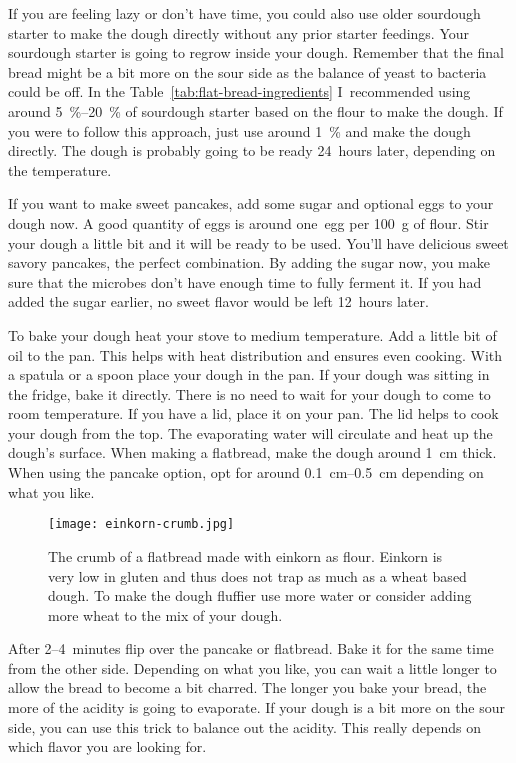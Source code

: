If you are feeling lazy or don't have time, you could also use older sourdough starter
to make the dough directly without any prior starter feedings. Your sourdough starter
is going to regrow inside your dough. Remember that the
final bread might be a bit more on the sour side as the balance of yeast to
bacteria could be off. In the Table~\ref{tab:flat-bread-ingredients}
I~recommended using around \qtyrange{5}{20}{\percent}
of sourdough starter based on the flour to make the dough. If you were to follow
this approach, just use around \qty{1}{\percent} and make the dough directly.
The dough is probably going to be ready 24~hours later, depending on the temperature.

If you want to make sweet pancakes, add some sugar and optional eggs to your dough
now. A good quantity of eggs is around one~egg per \qty{100}{\gram} of flour.
Stir your dough a little bit and it will be ready to be used. You'll
have delicious sweet savory pancakes, the perfect combination. By
adding the sugar now, you make sure that the microbes don't have
enough time to fully ferment it. If you had added the sugar
earlier, no sweet flavor would be left  12~hours later.

To bake your dough heat your stove to medium temperature. Add a little bit of
oil to the pan. This helps with heat distribution and ensures even cooking.
With a spatula or a spoon place your dough in the pan. If your dough
was sitting in the fridge, bake it directly. There is no need to wait for your
dough to come to room temperature. If you have a lid,
place it on your pan. The lid helps to cook your dough from the top.
The evaporating water will circulate and heat up the dough's surface. When
making a flatbread, make the dough around \qty{1}{\cm} thick. When using the
pancake option, opt for around \qtyrange{0.1}{0.5}{\cm} depending on what you
like.

\begin{figure}[htb]
\begin{center}
  \texttt{[image: einkorn-crumb.jpg]}
  \caption[Einkorn crum]{The crumb of a flatbread made with einkorn as flour.
      Einkorn is very low in gluten and thus does not trap as much  as
      a wheat based dough. To make the dough fluffier use more water or
      consider adding more wheat to the mix of your dough.}
\end{center}
\end{figure}

After 2--4~minutes flip over the pancake or flatbread. Bake it for the same
time from the other side. Depending on what you like, you can wait a little
longer to allow the bread to become a bit charred. The longer you
bake your bread, the more of the acidity is going to evaporate. If your
dough is a bit more on the sour side, you can use this trick to balance
out the acidity. This really depends on which flavor you are looking for.

